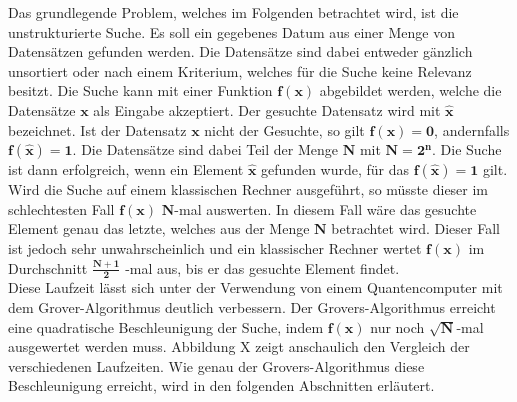 Das grundlegende Problem, welches im Folgenden betrachtet wird, ist die unstrukturierte Suche. 
Es soll ein gegebenes Datum aus einer Menge von Datensätzen gefunden werden. 
Die Datensätze sind dabei entweder gänzlich unsortiert oder nach einem Kriterium, welches für die Suche keine Relevanz besitzt. 
Die Suche kann mit einer Funktion $\mathbf{f(x)}$ abgebildet werden, welche die Datensätze $\mathbf{x}$ als Eingabe akzeptiert. 
Der gesuchte Datensatz wird mit $\mathbf{\hat x}$ bezeichnet. Ist der Datensatz $\mathbf{x}$ nicht der Gesuchte, so gilt $\mathbf{f(x) = 0}$, andernfalls $\mathbf{f(\hat x) = 1}$. 
Die Datensätze sind dabei Teil der Menge $\mathbf{N}$ mit $\mathbf{N = 2^n}$. Die Suche ist dann erfolgreich, wenn ein Element $\mathbf{\hat x}$ gefunden wurde, für das $\mathbf{f(\hat x) = 1}$ gilt.
\newline
\\
Wird die Suche auf einem klassischen Rechner ausgeführt, so müsste dieser im schlechtesten Fall $\mathbf{f(x)}$ $\mathbf{N}$-mal auswerten. 
In diesem Fall wäre das gesuchte Element genau das letzte, welches aus der Menge $\mathbf{N}$ betrachtet wird. 
Dieser Fall ist jedoch sehr unwahrscheinlich und ein klassischer Rechner wertet $\mathbf{f(x)}$ im Durchschnitt $\mathbf{\frac{N+1}{2}}$ -mal aus, bis er das gesuchte Element findet.
\\
Diese Laufzeit lässt sich unter der Verwendung von einem Quantencomputer mit dem Grover-Algorithmus deutlich verbessern. 
Der Grovers-Algorithmus erreicht eine quadratische Beschleunigung der Suche, indem $\mathbf{f(x)}$ nur noch $\mathbf{\sqrt{N}}$-mal ausgewertet werden muss. 
Abbildung X zeigt anschaulich den Vergleich der verschiedenen Laufzeiten. Wie genau der Grovers-Algorithmus diese Beschleunigung erreicht, wird in den folgenden Abschnitten erläutert.